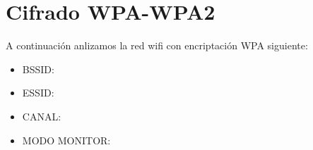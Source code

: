 \section{Cifrado WPA-WPA2}

A continuación anlizamos la red wifi con encriptación WPA siguiente:\\

\begin{itemize}
        \item BSSID: 
        \item ESSID: 
        \item CANAL: 
        \item MODO MONITOR: 
\end{itemize}
